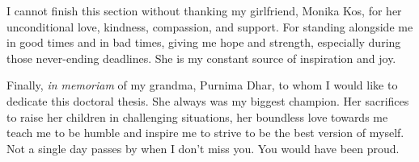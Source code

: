 I cannot finish this section without thanking my girlfriend, Monika Kos, for her unconditional love, kindness, compassion, and support. For standing alongside me in good times and in bad times, giving me hope and strength, especially during those never-ending deadlines. She is my constant source of inspiration and joy.

\vspace{1cm}
Finally, \emph{in memoriam} of my grandma, Purnima Dhar, to whom I would like to dedicate this doctoral thesis. She always was my biggest champion. Her sacrifices to raise her children in challenging situations, her boundless love towards me teach me to be humble and inspire me to strive to be the best version of myself. Not a single day passes by when I don't miss you. You would have been proud.


\endgroup
